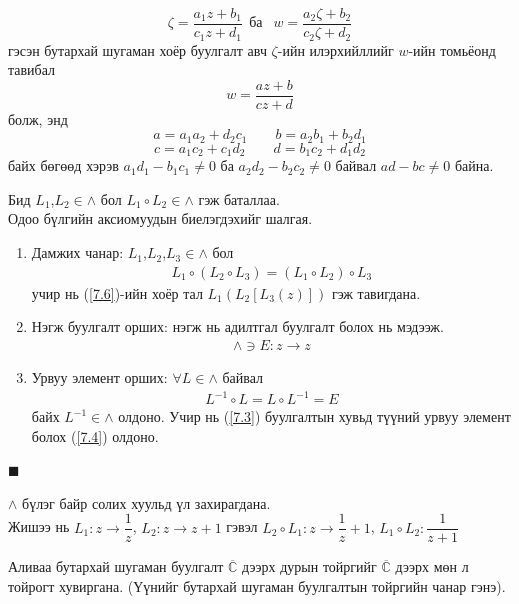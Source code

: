 \begin{prf}
$$\zeta=\frac{a_1z+b_1}{c_1z+d_1} \ \ \text{ба }\ \ w=\frac{a_2\zeta+b_2}{c_2\zeta+d_2}$$
гэсэн бутархай шугаман хоёр буулгалт авч $\zeta$-ийн илэрхийллийг $w$-ийн томьёонд тавибал
$$w=\frac{az+b}{cz+d}$$ болж, энд
$$a=a_1a_2+d_2c_1 \qquad b=a_2b_1+b_2d_1$$
$$c=a_1c_2+c_1d_2 \qquad d=b_1c_2+d_1d_2$$
байх бөгөөд хэрэв $a_1d_1-b_1c_1\neq 0$ ба $a_2d_2-b_2c_2\neq 0$ байвал $ad-bc\neq 0$ байна.

Бид $L_1$,$L_2\in\wedge$ бол $L_1\circ L_2\in \wedge$ гэж баталлаа. \\
Одоо бүлгийн аксиомуудын биелэгдэхийг шалгая.
\begin{enumerate}
    \item [\textbf{a)}] 
    Дамжих чанар: $L_1$,$L_2$,$L_3\in \wedge$ бол
    \begin{eqnarray} \label{7.6}
    L_1\circ (L_2\circ L_3)=(L_1\circ L_2)\circ L_3
    \end{eqnarray}
    учир нь (\ref{7.6})-ийн хоёр тал $L_1(L_2[L_3(z)])$ гэж тавигдана.
    \item [\textbf{б)}] Нэгж буулгалт орших: нэгж нь адилтгал буулгалт болох нь мэдээж.
    \begin{eqnarray}
    \wedge \ni E:z\rightarrow z
    \end{eqnarray}
     \item [\textbf{в)}] Урвуу элемент орших: $\forall L\in\wedge$ байвал 
     \begin{eqnarray}
     L^{-1}\circ L=L\circ L^{-1}=E
     \end{eqnarray}
     байх $L^{-1}\in \wedge$ олдоно. Учир нь (\ref{7.3}) буулгалтын хувьд түүний урвуу элемент болох (\ref{7.4}) олдоно. 
\end{enumerate}
\hfill $\blacksquare$\end{prf}
\begin{hnt}
$\wedge$ бүлэг байр солих хуульд үл захирагдана.\\
Жишээ нь $L_1:z\rightarrow \dfrac{1}{z}$, $L_2:z\rightarrow z+1$ гэвэл $L_2\circ L_1:z\rightarrow \dfrac{1}{z}+1$, $L_1\circ L_2:\dfrac{1}{z+1}$
\end{hnt}
\begin{thm}
Аливаа бутархай шугаман буулгалт $\overline{\mathbb{C}}$ дээрх дурын тойргийг $\overline{\mathbb{C}}$ дээрх мөн л тойрогт хувиргана. (Үүнийг бутархай шугаман буулгалтын тойргийн чанар гэнэ).
\end{thm}
